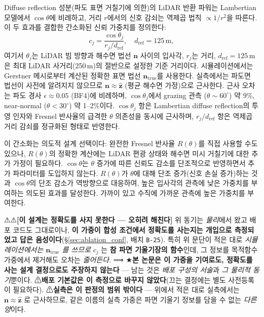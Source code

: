 \documentclass[11pt]{report}
\numberwithin{equation}{chapter}
\numberwithin{figure}{chapter}
\numberwithin{table}{chapter}
\begin{document}
Diffuse reflection 성분(파도 표면 거칠기에 의한)의 LiDAR 반환 파워는
Lambertian 모델에서 $\cos\theta$에 비례하고,
거리 $r$에서의 신호 감쇠는 역제곱 법칙 $\propto 1/r^2$을 따른다.
이 두 효과를 결합한 간소화된 신뢰 가중치를 정의한다:
\begin{equation}
  c_j = \frac{\cos\theta_j}{r_j / d_{\mathrm{ref}}}, \quad d_{\mathrm{ref}} = 125\,\text{m},
  \label{eq:confidence}
\end{equation}
여기서 $\theta_j$는 LiDAR 빔 방향과 해수면 법선 $\mathbf{n}$ 사이의 입사각,
$r_j$는 거리, $d_{\mathrm{ref}} = 125$\,m은 최대 LiDAR 사거리(250\,m)의 절반으로
설정한 기준 거리이다.
시뮬레이션에서는 Gerstner 메시로부터 계산된 정확한 표면 법선
$\mathbf{n}_{\text{true}}$를 사용한다. 실측에서는 파도면 법선이 사전에
알려지지 않으므로 $\mathbf{n} \approx \hat{\mathbf{z}}$ (평균 해수면 가정)으로
근사한다. 근사 오차는 파도 경사 $\epsilon \approx 0.05$ (BF4)에 비례하며,
$\cos\theta_j$에서 grazing 관측 ($\theta \sim 60^\circ$) 약 9\%,
near-normal ($\theta < 30^\circ$) 약 1--2\%이다.
$\cos\theta_j$ 항은 Lambertian diffuse reflection의 투영 인자와
Fresnel 반사율의 급격한 $\theta$ 의존성을 동시에 근사하며,
$r_j/d_{\mathrm{ref}}$ 항은 역제곱 거리 감쇠를 정규화된 형태로 반영한다.

이 간소화는 의도적 설계 선택이다: 완전한 Fresnel 반사율 $R(\theta)$를
직접 사용할 수도 있으나, $R(\theta)$의 정확한 계산에는
LiDAR 편광 상태와 해수면 미시 거칠기에 대한 추가 가정이 필요하다.
$\cos\theta$는 $\theta$ 증가에 따른 신뢰도 감소를 단조적으로 반영하면서
추가 파라미터를 도입하지 않는다.
$R(\theta)$가 $\theta$에 대해 단조 증가(신호 손실 증가)하는 것과
$\cos\theta$의 단조 감소가 역방향으로 대응하여, 높은 입사각의
관측에 낮은 가중치를 부여하는 의도된 효과를 달성한다.
가까이 있고 수직에 가까운 관측에 높은 가중치를 부여한다.

⚠⚠\textbf{[이 설계는 정확도를 사지 못한다 --- 오히려 해친다]} 위 동기는 \emph{물리}에서
왔고 배포 코드도 그대로이나, \textbf{이 가중이 합성 조건에서 정확도를 사는지는 개입으로
측정되었고 답은 음성이다}(\S\ref{sec:ablation_conf}, 배치 \texttt{B-25}). 특히 위
문단이 적은 대로 \emph{시뮬레이션에서는 $\mathbf{n}_{\text{true}}$ 를 쓰므로} $c_j$ 는
\textbf{참 파면 기울기장의 함수}인데, 그 정보를 목적함수 가중에서 제거해도 오차는
\emph{줄어든다}. ⟹ ★\textbf{본 논문은 이 가중을 기여로도, 정확도를 사는 설계 결정으로도
주장하지 않는다} --- 남는 것은 \emph{배포 구성의 서술}과 \emph{그 물리적 동기}뿐이다.
⚠\textbf{배포 기본값은 이 측정으로 바꾸지 않았다}(끄는 결정에는 별도 사전등록이 필요하다).
⚠\textbf{실측은 이 판정의 범위 밖이다} --- 위에서 적은 대로 실측에서는
$\mathbf{n} \approx \hat{\mathbf{z}}$ 로 근사하므로, 같은 이름의 실측 가중은 파면 기울기
정보를 담을 수 없는 \emph{다른 양}이다.
\end{document}
